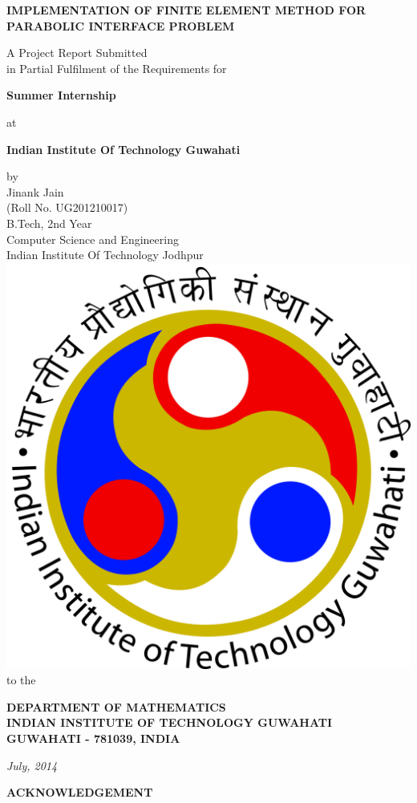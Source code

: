 \documentclass{report}
\numberwithin{equation}{chapter}
\begin{document}
\begin{center}
\begin{spacing}{1.5} { \textbf{ {\Large IMPLEMENTATION OF FINITE ELEMENT METHOD FOR PARABOLIC INTERFACE PROBLEM  \bigskip } } }
\end{spacing}
\bigskip \bigskip \bigskip \bigskip \bigskip A Project Report Submitted \\ in Partial Fulfilment of the Requirements for\\ \begin{spacing}{1.5} {\textbf{ \Large Summer Internship}}\end{spacing}
at \\ \begin{spacing}{1.5} {\textbf{ \Large Indian Institute Of Technology Guwahati \linebreak[5] }}
\end{spacing}
\bigskip\bigskip\bigskip\bigskip
by\\ Jinank Jain\\ (Roll No. UG201210017)\\ B.Tech, 2nd Year\\Computer Science and Engineering\\ Indian Institute Of Technology Jodhpur\\ \bigskip \bigskip
\includegraphics[scale=0.07]{iitg}\\ \bigskip to the\\ 
 \begin{spacing}{1.4} {\textbf{ \large DEPARTMENT OF MATHEMATICS \\ INDIAN INSTITUTE OF TECHNOLOGY GUWAHATI \\ GUWAHATI - 781039, INDIA\\ \bigskip}}\end{spacing}
 \textsl{July, 2014}
 
 \newpage
 {\textbf{ \Large ACKNOWLEDGEMENT\\ \bigskip}}
 \end{center}
\end{document}

